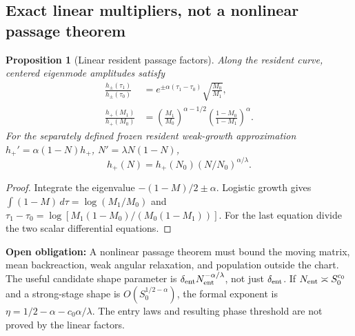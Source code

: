 \documentclass[11pt]{article}
\numberwithin{equation}{section}
\newtheorem{proposition}{Proposition}[section]
\theoremstyle{definition}
\theoremstyle{remark}
\newcommand{\1}{\mathbf 1}
\newcommand{\dd}{\,d}
\newcommand{\openobligation}[1]{\par\noindent\textbf{Open obligation:} #1\par\smallskip}
\begin{document}
\subsection{Exact linear multipliers, not a nonlinear passage theorem}
\begin{proposition}[Linear resident passage factors]\label{pa:multipliers}
Along the resident curve, centered eigenmode amplitudes satisfy
\begin{align}
 \frac{h_\pm(\tau_1)}{h_\pm(\tau_0)}
 &=e^{\pm\alpha(\tau_1-\tau_0)}\sqrt{\frac{M_0}{M_1}},\label{pa:mult-time}\\
 \frac{h_+(M_1)}{h_+(M_0)}
 &=\left(\frac{M_1}{M_0}\right)^{\alpha-1/2}
 \left(\frac{1-M_0}{1-M_1}\right)^\alpha.\label{pa:mult-mass}
\end{align}
For the separately defined frozen resident weak-growth approximation
$h_+'=\alpha(1-N)h_+$, $N'=\lambda N(1-N)$,
\begin{equation}\label{pa:mult-weak}
 h_+(N)=h_+(N_0)(N/N_0)^{\alpha/\lambda}.
\end{equation}
\end{proposition}
\begin{proof}
Integrate the eigenvalue $-(1-M)/2\pm\alpha$. Logistic growth gives
$\int(1-M)\dd\tau=\log(M_1/M_0)$ and
$\tau_1-\tau_0=\log[M_1(1-M_0)/(M_0(1-M_1))]$.
For the last equation divide the two scalar differential equations.
\end{proof}
\openobligation{A nonlinear passage theorem must bound the moving matrix,
mean backreaction, weak angular relaxation, and population outside the chart.
The useful candidate shape parameter is
$\delta_{\rm ent}N_{\rm ent}^{-\alpha/\lambda}$, not just
$\delta_{\rm ent}$. If $N_{\rm ent}\asymp S_0^{c_0}$ and a strong-stage
shape is $O(S_0^{1/2-\alpha})$, the formal exponent is
$\eta=1/2-\alpha-c_0\alpha/\lambda$. The entry laws and resulting
phase threshold are not proved by the linear factors.}
\end{document}
